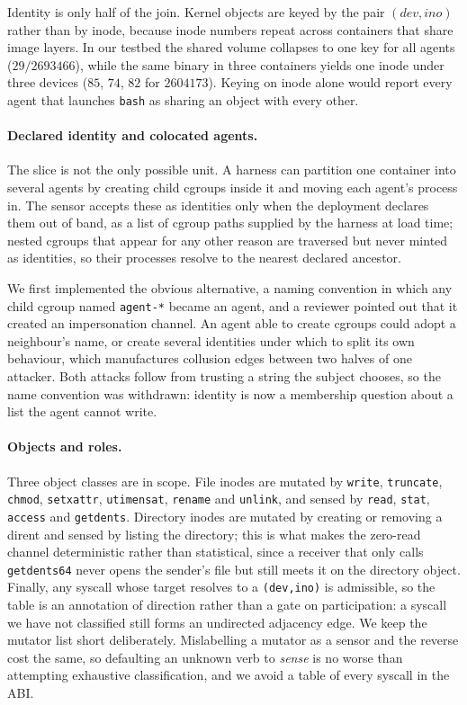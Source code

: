 \documentclass[11pt]{article}
\begin{document}
Identity is only half of the join. Kernel objects are keyed by the pair
$(\mathit{dev},\mathit{ino})$ rather than by inode, because inode numbers repeat
across containers that share image layers. In our testbed the shared volume
collapses to one key for all agents ($29/2693466$), while the same binary in three
containers yields one inode under three devices ($85$, $74$, $82$ for
$2604173$). Keying on inode alone would report every agent that launches
\texttt{bash} as sharing an object with every other.

\paragraph{Declared identity and colocated agents.} The slice is not the only
possible unit. A harness can partition one container into several agents by
creating child cgroups inside it and moving each agent's process in. The sensor
accepts these as identities only when the deployment declares them out of band, as
a list of cgroup paths supplied by the harness at load time; nested cgroups that
appear for any other reason are traversed but never minted as identities, so their
processes resolve to the nearest declared ancestor.

We first implemented the obvious alternative, a naming convention in which any
child cgroup named \texttt{agent-*} became an agent, and a reviewer pointed out
that it created an impersonation channel. An agent able to create cgroups could
adopt a neighbour's name, or create several identities under which to split its
own behaviour, which manufactures collusion edges between two halves of one
attacker. Both attacks follow from trusting a string the subject chooses, so the
name convention was withdrawn: identity is now a membership question about a list
the agent cannot write.

\paragraph{Objects and roles.} Three object classes are in scope. File inodes are
mutated by \texttt{write}, \texttt{truncate}, \texttt{chmod}, \texttt{setxattr},
\texttt{utimensat}, \texttt{rename} and \texttt{unlink}, and sensed by
\texttt{read}, \texttt{stat}, \texttt{access} and \texttt{getdents}. Directory
inodes are mutated by creating or removing a dirent and sensed by listing the
directory; this is what makes the zero-read channel deterministic rather than
statistical, since a receiver that only calls \texttt{getdents64} never opens the
sender's file but still meets it on the directory object. Finally, any syscall
whose target resolves to a \texttt{(dev,ino)} is admissible, so the table is an
annotation of direction rather than a gate on participation: a syscall we have not
classified still forms an undirected adjacency edge. We keep the mutator list
short deliberately. Mislabelling a mutator as a sensor and the reverse cost the
same, so defaulting an unknown verb to \emph{sense} is no worse than attempting
exhaustive classification, and we avoid a table of every syscall in the ABI.
\end{document}
